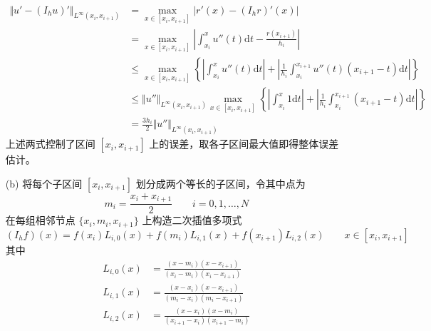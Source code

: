 \documentclass[a4paper]{article}
\begin{document}
\begin{enumerate}
\begin{equation}
\begin{aligned}
                \end{aligned}
            \end{equation}
            \begin{equation}
                \begin{aligned}
                    \Vert u'-(I_h u)' \Vert_{L^{\infty}(x_i,x_{i+1})} 
                    &= \max_{x\in [x_i,x_{i+1}]}\left|r'(x)- (I_h r)'(x)\right|\\
                    &= \max_{x\in [x_i,x_{i+1}]}\left|\int_{x_i}^{x}u''(t)\text{d}t-\frac{r(x_{i+1})}{h_i}\right|\\
                    &\leq \max_{x\in [x_i,x_{i+1}]}\left\{
                        \left|\int_{x_i}^{x}u''(t)\text{d}t\right|
                        +\left|\frac{1}{h_i}\int_{x_i}^{x_{i+1}}u''(t)(x_{i+1}-t)\text{d}t\right|
                    \right\}\\
                    &\leq \Vert u''\Vert_{L^{\infty}(x_i,x_{i+1})} \max_{x\in [x_i,x_{i+1}]}\left\{
                        \left|\int_{x_i}^{x}1\text{d}t\right|
                    +\left|\frac{1}{h_i}\int_{x_i}^{x_{i+1}}(x_{i+1}-t)\text{d}t\right|
                    \right\}\\
                    &= \frac{3h_i}{2} \Vert u''\Vert_{L^{\infty}(x_i,x_{i+1})}
                \end{aligned}
            \end{equation}
            上述两式控制了区间 $[x_i,x_{i+1}]$ 上的误差，取各子区间最大值即得整体误差估计。
    \item[(b)] 将每个子区间 $[x_i, x_{i+1}]$ 划分成两个等长的子区间，令其中点为
            \begin{equation}
                m_i = \frac{x_i+x_{i+1}}{2} \qquad i=0,1,\ldots,N
            \end{equation}
            在每组相邻节点 $\{x_i, m_i, x_{i+1}\}$ 上构造二次插值多项式
            \begin{equation}
                (I_h f)(x) = f(x_i)L_{i,0}(x) + f(m_i)L_{i,1}(x) + f(x_{i+1})L_{i,2}(x)
                \qquad x\in [x_i, x_{i+1}]
            \end{equation}
            其中
            \begin{align}
                L_{i,0}(x) &= \frac{(x-m_i)(x-x_{i+1}){}}{(x_i-m_i)(x_i-x_{i+1})}\\
                L_{i,1}(x) &= \frac{(x-x_i)(x-x_{i+1}){}}{(m_i-x_i)( m_i-x_{i+1})}\\
                L_{i,2}(x) &= \frac{(x-x_i)(x-m_i)}{(x_{i+1}-x_i)(x_{i+1}-m_i)}

\end{align}
\end{enumerate}
\end{document}
